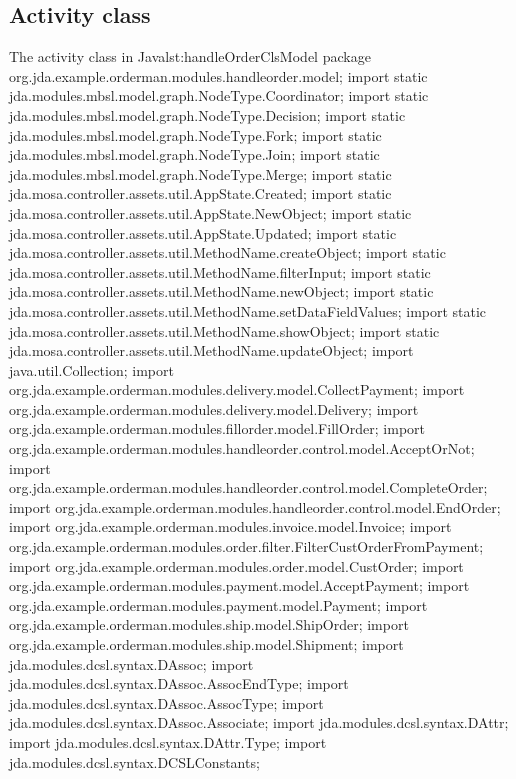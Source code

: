 \subsection{Activity class } 
\label{apex:agl-classOrderMan}
\begin{lstcodeplainssm}{The activity class  in Java}{lst:handleOrderClsModel}
package org.jda.example.orderman.modules.handleorder.model;
import static jda.modules.mbsl.model.graph.NodeType.Coordinator;
import static jda.modules.mbsl.model.graph.NodeType.Decision;
import static jda.modules.mbsl.model.graph.NodeType.Fork;
import static jda.modules.mbsl.model.graph.NodeType.Join;
import static jda.modules.mbsl.model.graph.NodeType.Merge;
import static jda.mosa.controller.assets.util.AppState.Created;
import static jda.mosa.controller.assets.util.AppState.NewObject;
import static jda.mosa.controller.assets.util.AppState.Updated;
import static jda.mosa.controller.assets.util.MethodName.createObject;
import static jda.mosa.controller.assets.util.MethodName.filterInput;
import static jda.mosa.controller.assets.util.MethodName.newObject;
import static jda.mosa.controller.assets.util.MethodName.setDataFieldValues;
import static jda.mosa.controller.assets.util.MethodName.showObject;
import static jda.mosa.controller.assets.util.MethodName.updateObject;
import java.util.Collection;
import org.jda.example.orderman.modules.delivery.model.CollectPayment;
import org.jda.example.orderman.modules.delivery.model.Delivery;
import org.jda.example.orderman.modules.fillorder.model.FillOrder;
import org.jda.example.orderman.modules.handleorder.control.model.AcceptOrNot;
import org.jda.example.orderman.modules.handleorder.control.model.CompleteOrder;
import org.jda.example.orderman.modules.handleorder.control.model.EndOrder;
import org.jda.example.orderman.modules.invoice.model.Invoice;
import org.jda.example.orderman.modules.order.filter.FilterCustOrderFromPayment;
import org.jda.example.orderman.modules.order.model.CustOrder;
import org.jda.example.orderman.modules.payment.model.AcceptPayment;
import org.jda.example.orderman.modules.payment.model.Payment;
import org.jda.example.orderman.modules.ship.model.ShipOrder;
import org.jda.example.orderman.modules.ship.model.Shipment;
import jda.modules.dcsl.syntax.DAssoc;
import jda.modules.dcsl.syntax.DAssoc.AssocEndType;
import jda.modules.dcsl.syntax.DAssoc.AssocType;
import jda.modules.dcsl.syntax.DAssoc.Associate;
import jda.modules.dcsl.syntax.DAttr;
import jda.modules.dcsl.syntax.DAttr.Type;
import jda.modules.dcsl.syntax.DCSLConstants;

\end{lstcodeplainssm}
